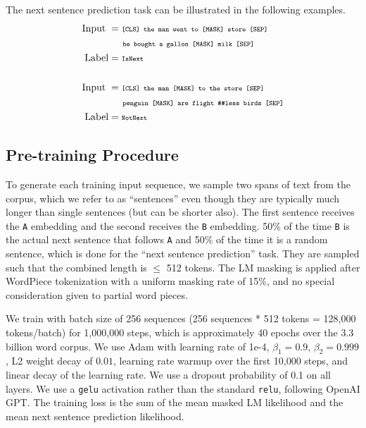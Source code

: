 \documentclass[11pt,a4paper]{article}
\begin{document}
The next sentence prediction task can be illustrated in the following examples.
\begin{align*}
\text{Input\;} &= \text{\tt {\scriptsize [CLS] the man went to [MASK] store [SEP]}} \\ 
& \text{\tt {\scriptsize \;\;\;\;\;\;\;he bought a gallon [MASK] milk [SEP]}}\\
\text{Label} &= \text{\tt {\scriptsize IsNext}} \\
\\
\text{Input\;} &= \text{\tt {\scriptsize [CLS] the man [MASK] to the store [SEP]}}\\
&\text{\tt {\scriptsize \;\;\;\;\;\;\;penguin [MASK] are flight \#\#less birds [SEP]}}\\
\text{Label} &= \text{\tt {\scriptsize NotNext}}
\end{align*}

\subsection{Pre-training Procedure}
\label{sec:pretraining_procedure}

To generate each training input sequence, we sample two spans of text from the corpus, which we refer to as ``sentences'' even though they are typically much longer than single sentences (but can be shorter also). The first sentence receives the {\tt A} embedding and the second receives the {\tt B} embedding. 50\% of the time {\tt B} is the actual next sentence that follows {\tt A} and 50\% of the time it is a random sentence, which is done for the ``next sentence prediction'' task. They are sampled such that the combined length is $\le$ 512 tokens. The LM masking is applied after WordPiece tokenization with a uniform masking rate of 15\%, and no special consideration given to partial word pieces.

We train with batch size of 256 sequences (256 sequences * 512 tokens = 128,000 tokens/batch) for 1,000,000 steps, which is approximately 40 epochs over the 3.3 billion word corpus. We use Adam with learning rate of 1e-4, ${\beta}_1=0.9$, ${\beta}_2=0.999$, L2 weight decay of $0.01$, learning rate warmup over the first 10,000 steps, and linear decay of the learning rate. We use a dropout probability of 0.1 on all layers. We use a {\tt gelu} activation \cite{hendrycks:2016} rather than the standard {\tt relu}, following OpenAI GPT. The training loss is the sum of the mean masked LM likelihood and the mean next sentence prediction likelihood.
\end{document}
